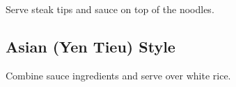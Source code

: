 \begin{recipe}
Serve steak tips and sauce on top of the noodles.

\subsection{Asian (Yen Tieu) Style}


Combine sauce ingredients and serve over white rice.

\end{recipe}

